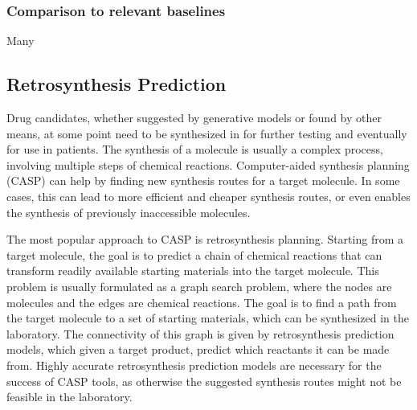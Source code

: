 \subsubsection{Comparison to relevant baselines}
Many 



\subsection{Retrosynthesis Prediction\label{sec:retrosynthesis}}
Drug candidates, whether suggested by generative models or found by other means,
at some point need to be synthesized in for further testing and 
eventually for use in patients. The synthesis of a molecule is usually a complex
process, involving multiple steps of chemical reactions. Computer-aided synthesis 
planning (CASP) can help by finding new synthesis routes for a target molecule.
In some cases, this can lead to more efficient and cheaper synthesis routes, or
even enables the synthesis of previously inaccessible molecules.

The most popular approach to CASP is retrosynthesis planning. Starting from a
target molecule, the goal is to predict a chain of chemical reactions that can
transform readily available starting materials into the target molecule. This
problem is usually formulated as a graph search problem, where the nodes are
molecules and the edges are chemical reactions. The goal is to find a path from
the target molecule to a set of starting materials, which can be synthesized in
the laboratory. The connectivity of this graph is given by retrosynthesis
prediction models, which given a target product, predict which reactants it can
be made from. Highly accurate retrosynthesis prediction models are necessary for
the success of CASP tools, as otherwise the suggested synthesis routes might not
be feasible in the laboratory.

